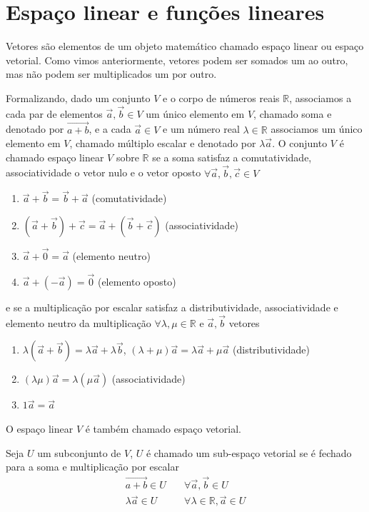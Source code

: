 \documentclass[12pt, oneside, a4paper, english, brazil]{abntex2}
\providecommand{\R}{\mathbb{R}}
\renewcommand{\vec}{\overrightarrow}
\theoremstyle{normal}
\theoremstyle{observacao}
\begin{document}
\section{Espaço linear e funções lineares}
Vetores são elementos de um objeto matemático chamado espaço linear ou espaço vetorial. Como vimos anteriormente, vetores podem ser somados um ao outro, mas não podem ser multiplicados um por outro. 

Formalizando, dado um conjunto $V$ e o corpo de números reais $\R$, associamos a cada par de elementos $\vec{a}, \vec{b} \in V$ um único elemento em $V$, chamado soma e denotado por $\vec{a + b}$, e a cada $\vec{a} \in V$ e um número real $\lambda \in \R$ associamos um único elemento em $V$, chamado múltiplo escalar e denotado por $\lambda\vec{a}$. O conjunto $V$ é chamado espaço linear $V$ sobre $\R$ se a soma satisfaz a comutatividade, associatividade o vetor nulo e o vetor oposto $\forall \vec{a}, \vec{b}, \vec{c} \in V$ 
\begin{enumerate}
\item $\vec{a} + \vec{b} = \vec{b}+\vec{a}$ (comutatividade)
\item $(\vec{a} + \vec{b})+\vec{c}=\vec{a} + (\vec{b}+\vec{c})$ (associatividade)
\item $\vec{a} + \vec{0} = \vec{a}$ (elemento neutro)
\item $\vec{a} + (-\vec{a}) = \vec{0}$ (elemento oposto)
\end{enumerate}
e se a multiplicação por escalar satisfaz a distributividade, associatividade e elemento neutro da multiplicação $\forall \lambda, \mu \in \mathbb{R}$ e $\vec{a}, \vec{b}$ vetores
\begin{enumerate}
\item $\lambda(\vec{a}+\vec{b}) = \lambda\vec{a}+\lambda\vec{b}$, $(\lambda+\mu)\vec{a}= \lambda\vec{a}+\mu\vec{a}$ (distributividade)
\item $(\lambda\mu)\vec{a}=\lambda(\mu\vec{a})$ (associatividade)
\item $1\vec{a} = \vec{a}$
\end{enumerate}

O espaço linear $V$ é também chamado espaço vetorial. 

Seja $U$ um subconjunto de $V$, $U$ é chamado um sub-espaço vetorial se é fechado para a soma e multiplicação por escalar
\begin{align*}
\vec{a+b} \in U &\quad \forall \vec{a}, \vec{b} \in U\\
\lambda\vec{a} \in U &\quad \forall \lambda \in \R, \vec{a} \in U
\end{align*}
\end{document}
